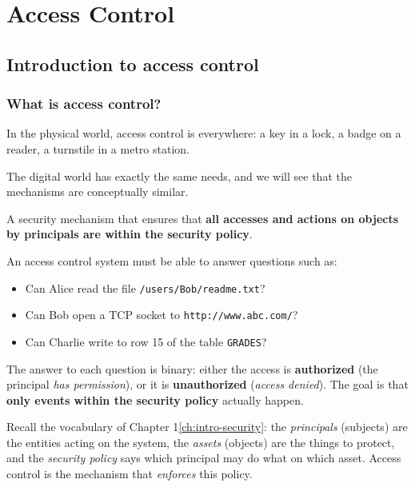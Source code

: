 
\chapter{Access Control}
\label{ch:access-control}

\section{Introduction to access control}

\subsection{What is access control?}

In the physical world, access control is everywhere: a key in a lock, a badge on a reader, a turnstile in a metro station.

The digital world has exactly the same needs, and we will see that the mechanisms are conceptually similar.

\begin{definition}
A security mechanism that ensures that \textbf{all accesses and actions on objects by principals are within the security policy}.
\end{definition}

An access control system must be able to answer questions such as:
\begin{itemize}
    \item Can Alice read the file \texttt{/users/Bob/readme.txt}?
    \item Can Bob open a TCP socket to \texttt{http://www.abc.com/}?
    \item Can Charlie write to row 15 of the table \texttt{GRADES}?
\end{itemize}

The answer to each question is binary: either the access is \textbf{authorized} (the principal \emph{has permission}), or it is \textbf{unauthorized} (\emph{access denied}). The goal is that \textbf{only events within the security policy} actually happen.

\begin{remark}
Recall the vocabulary of Chapter 1\ref{ch:intro-security}: the \emph{principals} (subjects) are the entities acting on the system, the \emph{assets} (objects) are the things to protect, and the \emph{security policy} says which principal may do what on which asset. Access control is the mechanism that \emph{enforces} this policy.
\end{remark}

